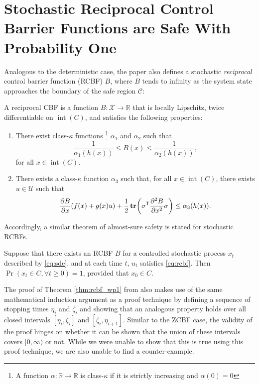 \documentclass[twocolumn,amsthm]{autart}
\newcommand{\T}{^\mathsf{T}}
\DeclareMathOperator{\Tr}{\mathbf{tr}}
\DeclareMathOperator{\interior}{int}
\newcommand*{\XSet}{\mathcal{X}}
\newcommand*{\USet}{\mathcal{U}}
\newcommand{\lft}{\mathopen{}\mathclose\bgroup\left}
\newcommand{\rht}{\aftergroup\egroup\right}
\begin{document}
\section{Stochastic Reciprocal Control Barrier Functions are Safe With Probability One}
Analogous to the deterministic case, the paper \cite{clark2021control} also defines a stochastic \textit{reciprocal} control barrier function (RCBF) $B$, where $B$ tends to infinity as the system state approaches the boundary of the safe region $\mathcal{C}$:
\begin{defn}
    A reciprocal CBF is a function $B : \XSet \to \mathbb{R}$ that is locally Lipschitz, twice differentiable on $\interior(C)$, and satisfies the following properties:
    \begin{enumerate}
        \item There exist class-$\mathcal{\kappa}$ functions
        \footnote{
        A function $\alpha : \mathbb{R} \to \mathbb{R}$ is class-$\mathcal{\kappa}$ if it is strictly increasing and $\alpha(0) = 0$
        }
        $\alpha_1$ and $\alpha_2$ such that
        \begin{equation} \label{eq:rcbf_bounds}
            \frac{1}{\alpha_1( h(x) )} \leq B(x) \leq \frac{1}{\alpha_2( h(x) )},
        \end{equation}
        for all $x \in \interior(C)$.
\item There exists a class-$\mathcal{\kappa}$ function $\alpha_3$ such that, for all $x \in \interior(C)$, there exists $u \in \USet$ such that
        \begin{equation} \label{eq:rcbf}
            \frac{\partial B}{\partial x}( f(x) + g(x) u ) + \frac{1}{2} \Tr\lft(\sigma\T \frac{\partial^2 B}{\partial x^2} \sigma\rht) \leq \alpha_3( h(x) ).
        \end{equation}
    \end{enumerate}
\end{defn}
Accordingly, a similar theorem of almost-sure safety is stated for stochastic RCBFs.
\begin{thm} \label{thm:rcbf_wp1}
Suppose that there exists an RCBF $B$ for a controlled stochastic process $x_t$ described by \eqref{eq:sde}, and at each time $t$, $u_t$ satisfies \eqref{eq:rcbf}. Then $\Pr(x_t \in C, \forall t\geq0) = 1$, provided that $x_0 \in C$.
\end{thm}

The proof of Theorem \ref{thm:rcbf_wp1} from \cite{clark2019control} also makes use of the same mathematical induction argument as a proof technique by defining a sequence of stopping times $\eta_i$ and $\zeta_i$ and showing that an analogous property holds over all closed intervals $[\eta_i, \zeta_i]$ and $[\zeta_i, \eta_{i+1}]$. Similar to the ZCBF case, the validity of the proof hinges on whether it can be shown that the union of these intervals covers $[0, \infty)$ or not. While we were unable to show that this is true using this proof technique, we are also unable to find a counter-example.
\end{document}
